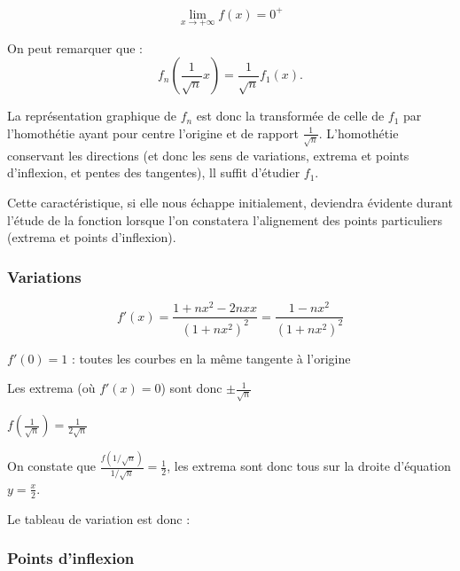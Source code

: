 \documentclass[a4paper,10pt]{report}
\begin{document}
\begin{displaymath}
	\lim_{x \rightarrow +\infty} f(x) = 0^{+}
\end{displaymath}

On peut remarquer que :
\begin{displaymath}
	f_n\left(\frac{1}{\sqrt{n}} x \right) = \frac{1}{\sqrt{n}} f_1(x).
\end{displaymath}

La représentation graphique de $f_n$ est donc la transformée de celle de $f_1$
par l'homothétie ayant pour centre l'origine et de rapport $\frac{1}{\sqrt{n}}$.
L'homothétie conservant les directions (et donc les sens de variations, extrema et
points d'inflexion, et pentes des tangentes), ll suffit d'étudier $f_1$.

Cette caractéristique, si elle nous échappe initialement, deviendra évidente durant
l'étude de la fonction lorsque l'on constatera l'alignement des points particuliers
(extrema et points d'inflexion).

\subsubsection*{Variations}

\begin{displaymath}
	f'(x) = \frac{1+nx^2-2nxx}{(1+nx^2)^2}=\frac{1-nx^2}{(1+nx^2)^2}
\end{displaymath}

$f'(0) = 1$ : toutes les courbes en la même tangente à l'origine

Les extrema (où $f'(x)=0$) sont donc $\pm\frac{1}{\sqrt{n}}$

$f(\frac{1}{\sqrt{n}}) = \frac{1}{2\sqrt{n}}$

On constate que $\frac{f(1/\sqrt{n})}{1/\sqrt{n}} = \frac{1}{2}$, les extrema sont donc tous sur la droite
d'équation $y=\frac{x}{2}$.

Le tableau de variation est donc :


\subsubsection*{Points d'inflexion}
\end{document}
